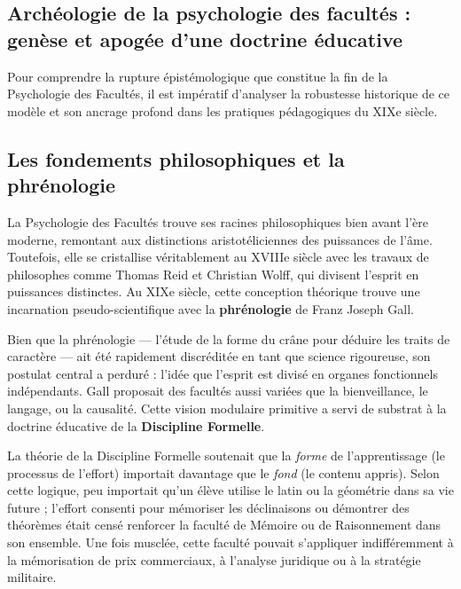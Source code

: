 \subsection{Archéologie de la psychologie des facultés : genèse et apogée d'une doctrine éducative}

Pour comprendre la rupture épistémologique que constitue la fin de la Psychologie des Facultés, il
est impératif d'analyser la robustesse historique de ce modèle et son ancrage profond dans les
pratiques pédagogiques du XIXe siècle.



\subsection{Les fondements philosophiques et la phrénologie}

La Psychologie des Facultés trouve ses racines philosophiques bien avant l'ère moderne, remontant
aux distinctions aristotéliciennes des puissances de l'âme. Toutefois, elle se cristallise
véritablement au XVIIIe siècle avec les travaux de philosophes comme Thomas Reid et Christian Wolff,
qui divisent l'esprit en puissances distinctes. Au XIXe siècle, cette conception théorique trouve
une incarnation pseudo-scientifique avec la \textbf{phrénologie} de Franz Joseph Gall.

Bien que la phrénologie — l'étude de la forme du crâne pour déduire les traits de caractère — ait
été rapidement discréditée en tant que science rigoureuse, son postulat central a perduré : l'idée
que l'esprit est divisé en \og organes\fg{} fonctionnels indépendants. Gall proposait des facultés
aussi variées que la \og bienveillance\fg{}, le \og langage\fg{}, ou la \og
causalité\fg{}.\cite{II-1-1-ref8} Cette vision modulaire primitive a servi de substrat à la doctrine
éducative de la \textbf{Discipline Formelle}.

La théorie de la Discipline Formelle soutenait que la \textit{forme} de l'apprentissage (le
processus de l'effort) importait davantage que le \textit{fond} (le contenu appris). Selon cette
logique, peu importait qu'un élève utilise le latin ou la géométrie dans sa vie future ; l'effort
consenti pour mémoriser les déclinaisons ou démontrer des théorèmes était censé renforcer la faculté
de \og Mémoire\fg{} ou de \og Raisonnement\fg{} dans son ensemble. Une fois \og musclée\fg{}, cette
faculté pouvait s'appliquer indifféremment à la mémorisation de prix commerciaux, à l'analyse
juridique ou à la stratégie militaire.\cite{II-1-1-ref2}



